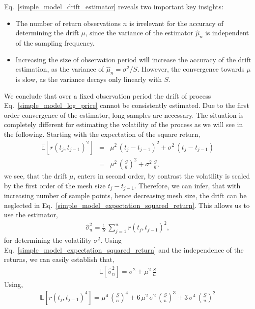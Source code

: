\documentclass[11pt, a4paper]{thesis}  %
\begin{document}
%
Eq.~\ref{simple_model_drift_estimator} reveals two important key insights: 
%
\begin{itemize}
	\item The number of return observations $n$ is irrelevant for 
	the accuracy of determining the drift $\mu$, since the variance of the estimator 
	$\hat{\mu}_n$ is independent of the sampling frequency. 
	
	\item Increasing the size of observation period will increase the accuracy of the drift estimation,
	as the variance of $\hat{\mu}_n = \sigma^2/S$. However, the convergence towards $\mu$ is slow, 
	as the variance decays only linearly with $S$.    
\end{itemize}
%
We conclude that over a fixed observation period the drift of process Eq.~\ref{simple_model_log_price} cannot be consistently estimated. Due to the first order convergence of the estimator, long samples are necessary. The  situation is completely different for estimating the volatility of the process as we will see in the following. Starting with the expectation of the square return, 
%
\begin{eqnarray}
	\mathbb{E}\left[r\left(t_j, t_{j-1}\right)^2\right] 
	&=& \mu^2\,\left(t_j-t_{j-1}\right)^2 + \sigma^2\,\left(t_j-t_{j-1}\right)
	\\\nonumber
	&=& \mu^2\,\left(\frac{S}{n}\right)^2 + \sigma^2\,\frac{S}{n},
	\label{simple_model_expectation_squared_return}
\end{eqnarray}
% 
we see, that the drift $\mu$, enters in second order, by contrast the volatility is scaled by the first order of the mesh size $t_j - t_{j-1}$. Therefore, we can infer, that with increasing number of sample points, hence decreasing mesh size, the drift can be neglected in Eq.~\ref{simple_model_expectation_squared_return}. This allows us to use the estimator, 
%
\begin{eqnarray}
	\hat{\sigma}^2_n = \frac{1}{S}\,\sum_{j=1}^{n} r\left(t_j, t_{j-1}\right)^2,
	\label{simple_model_volatility_estimator}
\end{eqnarray}
%
for determining the volatility $\sigma^2$. Using Eq.~\ref{simple_model_expectation_squared_return} and the independence of the returns, we can easily establish that,
% 
\begin{eqnarray}
	\mathbb{E}\left[\hat{\sigma}^2_n\right] = \sigma^2 + \mu^2\,\frac{S}{n}
\end{eqnarray}
%
Using, 
%
\begin{eqnarray}
	\mathbb{E}\left[r(t_j, t_{j-1})^4\right] = 
	\mu^4\,\left(\frac{S}{n}\right)^4 + 
	6\,\mu^2\,\sigma^2\,\left(\frac{S}{n}\right)^3 + 
	3\,\sigma^4\,\left(\frac{S}{n}\right)^2
\end{eqnarray}
\end{document}
